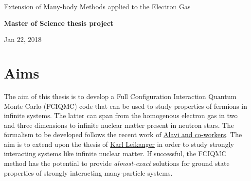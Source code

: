 \documentclass[%
oneside,                 %
final,                   %
10pt]{article}
\begin{document}

\newcommand{\exercisesection}[1]{\subsection*{#1}}






\thispagestyle{empty}

\begin{center}
{\LARGE\bf
\begin{spacing}{1.25}
Extension of Many-body Methods applied to the Electron Gas
\end{spacing}
}
\end{center}


\begin{center}
{\bf Master of Science thesis project${}^{}$} \\ [0mm]
\end{center}

\begin{center}
\end{center}
    

\begin{center}
Jan 22, 2018
\end{center}

\vspace{1cm}


\section{Aims}

The aim of this thesis is to develop a Full Configuration Interaction Quantum Monte Carlo (FCIQMC)
code that can be used to study properties of fermions in infinite systems. The latter can span from 
the homogenous electron gas in two and three dimensions to infinite nuclear matter present in neutron stars. 
The formalism to be developed follows the recent work of \href{{http://www.nature.com/nature/journal/v493/n7432/full/nature11770.html}}{Alavi and co-workers}. The aim is to extend upon the thesis of \href{{https://www.duo.uio.no/handle/10852/37172}}{Karl Leikanger} in order to study strongly interacting systems like infinite nuclear matter.  If successful, the FCIQMC method has the potential to provide \emph{almost-exact} solutions for ground state properties of strongly interacting many-particle systems. 
\end{document}
